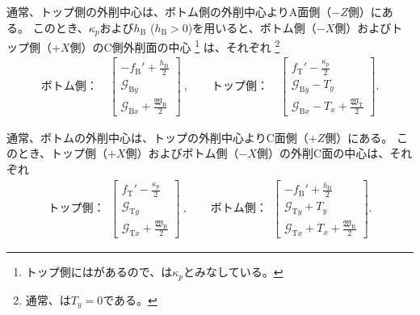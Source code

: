 通常、トップ側の外削中心は、ボトム側の外削中心よりA面側（$-Z$側）にある。
このとき、\KeywayPos$\kappa_p$および\BottomOutcutLength$h_\mathrm B$ ($h_\mathrm B > 0$)を用いると、ボトム側（$-X$側）およびトップ側（$+X$側）のC側外削面の中心
\footnote{トップ側には\Keyway があるので、\TopOutcutLength は\KeywayPos$\kappa_p$とみなしている。}
は、それぞれ
\footnote{通常、\CenterlineEndFaceDifBD は$T_y = 0$である。}
\begin{align}
  \label{eq:centerlineB}
  \text{ボトム側：}\quad
  \left[
    \begin{array}{c}
      \displaystyle -f_\mathrm B'+\frac{h_\mathrm B}2\\[5pt]
      \mathcal G_{\mathrm By}\\[3pt]
      \displaystyle \mathcal G_{\mathrm Bx}+\frac{\mathfrak W_\mathrm B}2
    \end{array}
    \right]~, \qquad
  \text{トップ側：}\quad
  \left[
    \begin{array}{c}
      \displaystyle f_\mathrm T'-\frac{\kappa_p}2\\[5pt]
      \mathcal G_{\mathrm By}-T_y\\[3pt]
      \displaystyle \mathcal G_{\mathrm Bx}-T_x+\frac{\mathfrak W_\mathrm T}2
    \end{array}
  \right].
\end{align}



通常、ボトムの外削中心は、トップの外削中心よりC面側（$+Z$側）にある。
このとき、トップ側（$+X$側）およびボトム側（$-X$側）の外削C面の中心は、それぞれ
\begin{align}
  \label{eq:centerlineT}
  \text{トップ側：}~~
  \left[
    \begin{array}{c}
      \displaystyle f_\mathrm T'-\frac{\kappa_p}2\\[5pt]
      \mathcal G_{\mathrm Ty}\\[3pt]
      \displaystyle \mathcal G_{\mathrm Tx}+\frac{\mathfrak W_\mathrm B}2
    \end{array}
    \right]~, \qquad
  \text{ボトム側：}~~
  \left[
    \begin{array}{c}
      \displaystyle -f_\mathrm B'+\frac{h_\mathrm B}2\\[5pt]
      \mathcal G_{\mathrm Ty}+T_y\\[3pt]
      \displaystyle \mathcal G_{\mathrm Tx}+T_x+\frac{\mathfrak W_\mathrm B}2
    \end{array}
  \right].
\end{align}

